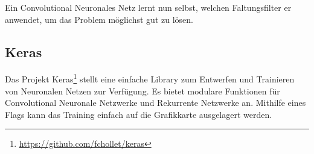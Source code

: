 Ein Convolutional Neuronales Netz lernt nun selbst, welchen Faltungsfilter er anwendet, um das Problem möglichst gut zu lösen.

\subsection{Keras}
Das Projekt Keras\footnote{\url{https://github.com/fchollet/keras}} stellt eine einfache Library zum Entwerfen und Trainieren von Neuronalen Netzen zur Verfügung. Es bietet modulare Funktionen für Convolutional Neuronale Netzwerke und Rekurrente Netzwerke an. Mithilfe eines Flags kann das Training einfach auf die Grafikkarte ausgelagert werden.